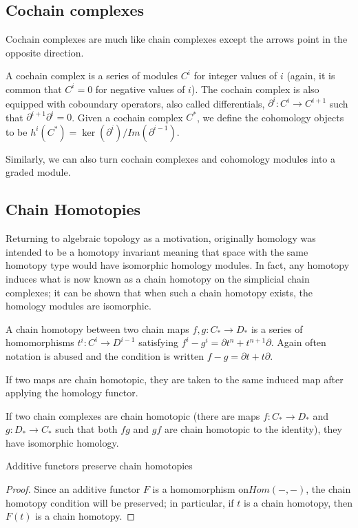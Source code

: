 \subsection{Cochain complexes}
Cochain complexes are much like chain complexes except the
arrows point in the
opposite direction.
\begin{definition} A cochain complex is a series of modules
$C^i$ for integer
values of $i$ (again, it is common that $C^i=0$ for negative
values of $i$). The
cochain complex is also equipped with coboundary operators, also
called
differentials, $\partial^i:C^i\rightarrow C^{i+1}$ such that
$\partial^{i+1}\partial^i=0$. Given a cochain complex $C^*$, we
define the
cohomology objects to be
$h^i(C^*)=\ker(\partial^i)/Im(\partial^{i-1})$.
\end{definition}
Similarly, we can also turn cochain complexes and cohomology
modules into a
graded module.

\subsection{Chain Homotopies}
Returning to algebraic topology as a motivation, originally
homology was
intended to be a homotopy invariant meaning that space with the
same homotopy
type would have isomorphic homology modules. In fact, any
homotopy induces what
is now known as a chain homotopy on the simplicial chain
complexes; it can be
shown that when such a chain homotopy exists, the homology
modules are
isomorphic.
\begin{definition} A chain homotopy between two chain maps
$f,g:C_*\rightarrow D_*$ is a series of homomorphisms
$t^i:C^i\rightarrow D^{i-1}$ satisfying $f^i-g^i=\partial t^n+
t^{n+1}\partial$. Again often notation is abused and the
condition is written $f-g=\partial t +
t\partial$.\end{definition}
\begin{theorem} If two maps are chain homotopic, they are taken
to the same induced map after applying the homology functor.
\end{theorem}
\begin{corollary} If two chain complexes are chain homotopic
(there are maps $f: C_*\rightarrow D_*$ and $g:D_*\rightarrow
C_*$ such that both $fg$ and $gf$ are chain homotopic to the
identity), they have isomorphic homology. \end{corollary}

\begin{theorem} Additive functors preserve chain homotopies
\end{theorem}
\begin{proof} Since an additive functor $F$ is a homomorphism on$Hom(-,-)$, the chain homotopy condition will be preserved; in
particular, if $t$ is a chain homotopy, then $F(t)$ is a chain
homotopy.\end{proof}

